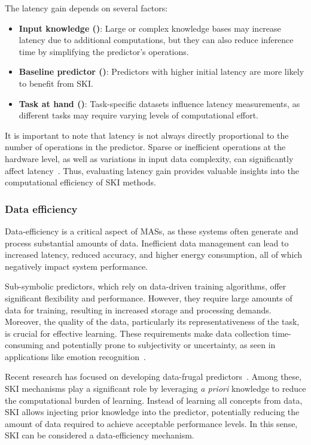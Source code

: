 %
The latency gain depends on several factors:
%
\begin{itemize}
    \item \textbf{Input knowledge ()}: Large or complex knowledge bases may increase latency due to additional computations, but they can also reduce inference time by simplifying the predictor's operations.
    \item \textbf{Baseline predictor ()}: Predictors with higher initial latency are more likely to benefit from \gls{SKI}.
    \item \textbf{Task at hand ()}: Task-specific datasets influence latency measurements, as different tasks may require varying levels of computational effort.
\end{itemize}

%
It is important to note that latency is not always directly proportional to the number of operations in the predictor.
%
Sparse or inefficient operations at the hardware level, as well as variations in input data complexity, can significantly affect latency~\cite{CITATION}.
%
Thus, evaluating latency gain provides valuable insights into the computational efficiency of \gls{SKI} methods.


\subsubsection{Data efficiency}\label{subsubsec:ski-meets-intelligent-agents-data-efficiency}
%
Data-efficiency is a critical aspect of \glspl{MAS}, as these systems often generate and process substantial amounts of data.
%
Inefficient data management can lead to increased latency, reduced accuracy, and higher energy consumption, all of which negatively impact system performance.

%
Sub-symbolic predictors, which rely on data-driven training algorithms, offer significant flexibility and performance.
%
However, they require large amounts of data for training, resulting in increased storage and processing demands.
%
Moreover, the quality of the data, particularly its representativeness of the task, is crucial for effective learning.
%
These requirements make data collection time-consuming and potentially prone to subjectivity or uncertainty, as seen in applications like emotion recognition~\cite{CITATION}.

%
Recent research has focused on developing data-frugal predictors~\cite{CITATION}.
%
Among these, \gls{SKI} mechanisms play a significant role by leveraging \emph{a priori} knowledge to reduce the computational burden of learning.
%
Instead of learning all concepts from data, \gls{SKI} allows injecting prior knowledge into the predictor, potentially reducing the amount of data required to achieve acceptable performance levels.
%
In this sense, \gls{SKI} can be considered a data-efficiency mechanism.

